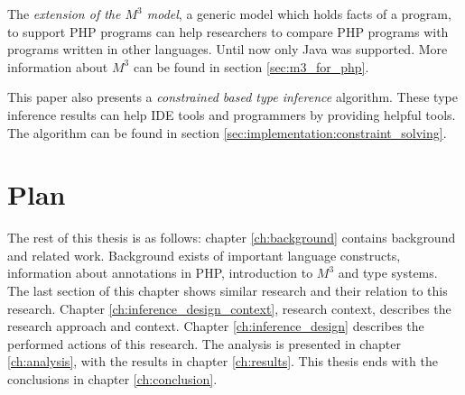 \documentclass[../main.tex]{subfiles}
\begin{document}
		The \textit{extension of the $M^3$ model}, a generic model which holds facts of a program, to support PHP programs can help researchers to compare PHP programs with programs written in other languages. 
		Until now only Java was supported.
		More information about $M^3$ can be found in section \ref{sec:m3_for_php}.
		
		This paper also presents a \textit{constrained based type inference} algorithm.
		These type inference results can help IDE tools and programmers by providing helpful tools.
		The algorithm can be found in section \ref{sec:implementation:constraint_solving}.
		
        
        
    
    \section{Plan} %
        The rest of this thesis is as follows:
        chapter \ref{ch:background} contains background and related work.
        Background exists of important language constructs, information about annotations in PHP, introduction to $M^3$ and type systems. 
        The last section of this chapter shows similar research and their relation to this research.
        Chapter \ref{ch:inference_design_context}, research context, describes the research approach and context.
        Chapter \ref{ch:inference_design} describes the performed actions of this research. 
        The analysis is presented in chapter \ref{ch:analysis}, with the results in chapter \ref{ch:results}.
        This thesis ends with the conclusions in chapter \ref{ch:conclusion}.
        
        
    
        
\end{document}
